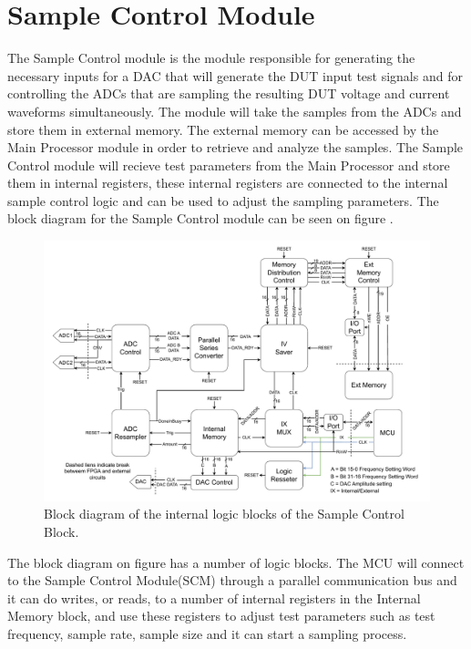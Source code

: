 \chapter{Sample Control Module} \label{sec:SampleControl}
The Sample Control module is the module responsible for generating the necessary inputs for a DAC that will generate the DUT input test signals and for controlling the ADCs that are sampling the resulting DUT voltage and current waveforms simultaneously. The module will take the samples from the ADCs and store them in external memory. The external memory can be accessed by the Main Processor module in order to retrieve and analyze the samples. The Sample Control module will recieve test parameters from the Main Processor and store them in internal registers, these internal registers are connected to the internal sample control logic and can be used to adjust the sampling parameters. The block diagram for the Sample Control module can be seen on figure .
\begin{figure}[H]
    \centering
    \includegraphics[clip, trim=0 0 0 0, width=1\textwidth]{Sections/7_SystemDesign/Figures/Sample_Control_Block.pdf}
    \caption{Block diagram of the internal logic blocks of the Sample Control Block.}
    \label{fig:7_SampleControlBlock}
\end{figure}

The block diagram on figure  has a number of logic blocks. The MCU will connect to the Sample Control Module(SCM) through a parallel communication bus and it can do writes, or reads, to a number of internal registers in the Internal Memory block, and use these registers to adjust test parameters such as test frequency, sample rate, sample size and it can start a sampling process. 


